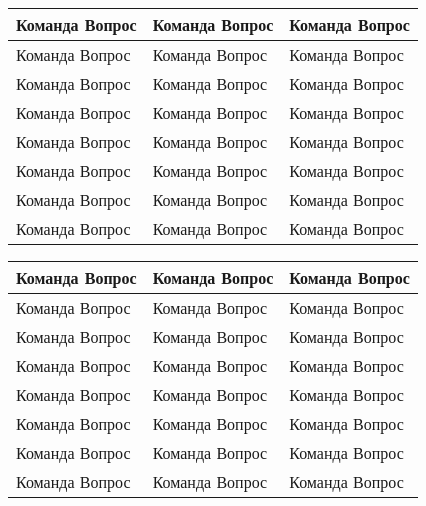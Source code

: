 
\usepackage{multicol}
\usepackage{tabularx}
\newdimen{\blankheight}
\newdimen{\blankwidth}
\newcommand{\cell}{\vspace{0.3em}\hspace{2em} Команда \makebox[2em]{\hrulefill}\hspace{\blankwidth} Вопрос \arabic{Questions}\stepcounter{Questions} \vspace{\blankheight}}

\begin{tabularx}{\textwidth}{>{\raggedright\arraybackslash}X|>{\raggedright\arraybackslash}X|>{\raggedright\arraybackslash}X}
\cell & \cell & \cell \\ \hline
\cell & \cell & \cell \\ \hline
\cell & \cell & \cell \\ \hline
\cell & \cell & \cell \\ \hline
\cell & \cell & \cell \\ \hline
\cell & \cell & \cell \\ \hline
\cell & \cell & \cell \\ \hline
\cell & \cell & \cell \\ \hline

\end{tabularx}
\clearpage
\begin{tabularx}{\textwidth}{>{\raggedright\arraybackslash}X|>{\raggedright\arraybackslash}X|>{\raggedright\arraybackslash}X}
\cell & \cell & \cell \\ \hline
\cell & \cell & \cell \\ \hline
\cell & \cell & \cell \\ \hline
\cell & \cell & \cell \\ \hline
\cell & \cell & \cell \\ \hline
\cell & \cell & \cell \\ \hline
\cell & \cell & \cell \\ \hline
\cell & \cell & \cell \\ \hline

\end{tabularx}


